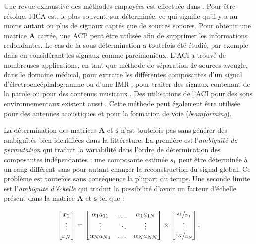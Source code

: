 Une revue exhaustive des méthodes employées est effectuée dans \cite{hyvarinen2004independent}.
Pour être résolue, l'ICA est, le plus souvent, sur-déterminée, ce qui signifie qu'il y a au moins autant ou plus de signaux captés que de sources sonores. Pour obtenir une matrice $\mathbf{A}$ carrée, une ACP peut être utilisée afin de supprimer les informations redondantes.  Le cas de la sous-détermination a toutefois été étudié, par exemple dans \cite{bofill2000blind} en considérant les signaux comme parcimonieux.
L'ACI a trouvé de nombreuses applications, en tant que méthode de séparation de sources aveugle, dans le domaine médical, pour extraire les différentes composantes d'un signal d'électroencéphalogramme \cite{delorme2007enhanced,makeig1996independent} ou d'une IMR \cite{lee1999independent}, pour traiter des signaux contenant de la parole \cite{sarela2005denoising, hsieh2009independent} ou pour des contenus musicaux \cite{uhle2003extraction, abdallah2003independent}. Des utilisations de l'ACI pour des sons environnementaux existent aussi \cite{lombard2011tdoa, eronen2006audio}. Cette méthode peut également être utilisée pour des antennes acoustiques et pour la formation de voie (\textit{beamforming})\cite{cardoso_blind_1998,saruwatari2003blind}.

La détermination des matrices $\mathbf{A}$ et $\mathbf{s}$ n'est toutefois pas sans générer des ambiguïtés bien identifiées dans la littérature. La première est l'\textit{ambiguïté de permutation} qui traduit la variabilité dans l'ordre de détermination des composantes indépendantes : une composante estimée $s_1$ peut être déterminée à un rang différent sans pour autant changer la reconstruction du signal global. Ce problème est toutefois sans conséquence la plupart du temps. Une seconde limite est l'\textit{ambiguïté d'échelle} qui traduit la possibilité d'avoir un facteur d'échelle présent dans la matrice $\mathbf{A}$ et $\mathbf{s}$ tel que :

\begin{equation}
\begin{bmatrix}
x_{1}\\
\vdots\\
x_{N}
\end{bmatrix} =
\begin{bmatrix}
\alpha_1 a_{11} & \dots & \alpha_1 a_{1N}\\
\vdots & \ddots & \vdots\\
\alpha_N a_{N1} & \dots & \alpha_N a_{NN}
\end{bmatrix}
\times
\begin{bmatrix}
\sfrac{s_{1}}{\alpha_1}\\
\vdots\\
\sfrac{s_{N}}{\alpha_N}
\end{bmatrix}.
\end{equation}

